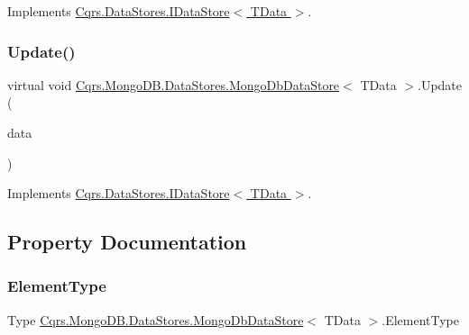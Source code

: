Implements \hyperlink{interfaceCqrs_1_1DataStores_1_1IDataStore_aead8d7a39a717d29af05daf7b64bea94}{Cqrs.\+Data\+Stores.\+I\+Data\+Store$<$ T\+Data $>$}.

\mbox{\label{classCqrs_1_1MongoDB_1_1DataStores_1_1MongoDbDataStore_af86a3df56e2df92fb9ef880ff4fa5f16}} 
\subsubsection{\texorpdfstring{Update()}{Update()}}
{\footnotesize\ttfamily virtual void \hyperlink{classCqrs_1_1MongoDB_1_1DataStores_1_1MongoDbDataStore}{Cqrs.\+Mongo\+D\+B.\+Data\+Stores.\+Mongo\+Db\+Data\+Store}$<$ T\+Data $>$.Update (\begin{DoxyParamCaption}\item[{T\+Data}]{data }\end{DoxyParamCaption})\hspace{0.3cm}{\ttfamily [virtual]}}



Implements \hyperlink{interfaceCqrs_1_1DataStores_1_1IDataStore_a6d5d4dd572de8db01ff0c48d37faefa7}{Cqrs.\+Data\+Stores.\+I\+Data\+Store$<$ T\+Data $>$}.



\subsection{Property Documentation}
\mbox{\label{classCqrs_1_1MongoDB_1_1DataStores_1_1MongoDbDataStore_a54f5798a67d64a47e6acb15f378fb246}} 
\subsubsection{\texorpdfstring{Element\+Type}{ElementType}}
{\footnotesize\ttfamily Type \hyperlink{classCqrs_1_1MongoDB_1_1DataStores_1_1MongoDbDataStore}{Cqrs.\+Mongo\+D\+B.\+Data\+Stores.\+Mongo\+Db\+Data\+Store}$<$ T\+Data $>$.Element\+Type\hspace{0.3cm}{\ttfamily [get]}}



